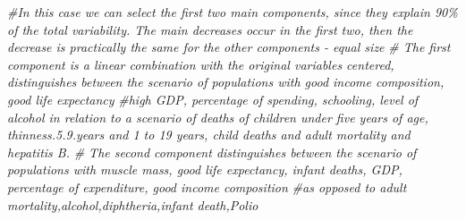 \documentclass[
]{article}
\newenvironment{Shaded}{\begin{snugshade}}{\end{snugshade}}
\newcommand{\CommentTok}[1]{\textcolor[rgb]{0.56,0.35,0.01}{\textit{#1}}}
\newcommand{\DocumentationTok}[1]{\textcolor[rgb]{0.56,0.35,0.01}{\textbf{\textit{#1}}}}
\newcommand{\FunctionTok}[1]{\textcolor[rgb]{0.13,0.29,0.53}{\textbf{#1}}}
\newcommand{\NormalTok}[1]{#1}
\newcommand{\SpecialCharTok}[1]{\textcolor[rgb]{0.81,0.36,0.00}{\textbf{#1}}}
\begin{document}
\begin{Shaded}
\begin{Highlighting}[]
\CommentTok{\#In this case we can select the first two main components, since they explain 90\% of the total variability. The main decreases occur in the first two, then the decrease is practically the same for the other components {-} equal size}
\CommentTok{\# The first component is a linear combination with the original variables centered, distinguishes between the scenario of populations with good income composition, good life expectancy}
\CommentTok{\#high GDP, percentage of spending, schooling, level of alcohol in relation to a scenario of deaths of children under five years of age, thinness.5.9.years and 1 to 19 years, child deaths and adult mortality and hepatitis B.}
\CommentTok{\# The second component distinguishes between the scenario of populations with muscle mass, good life expectancy, infant deaths, GDP, percentage of expenditure, good income composition}
\CommentTok{\#as opposed to adult mortality,alcohol,diphtheria,infant death,Polio}
\end{Highlighting}
\end{Shaded}

\begin{Shaded}
\end{Shaded}
\end{document}
